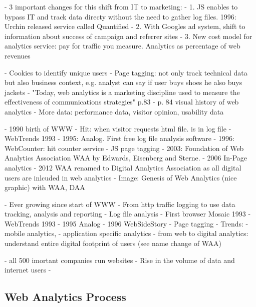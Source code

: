 - 3 important changes for this shift from IT to marketing:
- 1.  JS enables to bypass IT and track data directy without the need to gather log files. 1996: Urchin released service called Quantified
- 2.  With Googles ad system, shift to information about success of campaign and referrer sites
- 3. New cost model for analytics service: pay for traffic you measure. Analytics as percentage of web revenues

- Cookies to identify unique users
- Page tagging: not only track technical data but also business context, e.g. analyst can say if user buys shoes he also buys jackets
- "Today, web analytics is a marketing discipline used to measure the effectiveness of communications strategies" p.83
- p. 84 visual history of web analytics
- More data: performance data, visitor opinion, usability data




- 1990 birth of WWW
- Hit: when visitor requests html file. is in log file
- WebTrends 1993
- 1995: Analog. First free log file analysis software
- 1996: WebCounter: hit counter service
- JS page tagging
- 2003: Foundation of Web Analytics Association WAA by Edwards, Eisenberg and Sterne.
- 2006 In-Page analytics
- 2012 WAA renamed to Digital Analytics Association as all digital users are inlcuded in web analytics
- Image: Genesis of Web Analytics (nice graphic) with WAA, DAA



- Ever growing since start of WWW
- From http traffic logging to use data tracking, analysis and reporting
- Log file analysis
- First browser Mosaic 1993
- WebTrends 1993
- 1995 Analog
- 1996 WebSideStory
- Page tagging
- Trends:
- mobile analytics,
- application specific analytics
- from web to digital analytics: understand entire digital footprint of users (see name change of WAA)



- all 500 imortant companies run websites
- Rise in the volume of data and internet users
- 


\subsection{Web Analytics Process}


